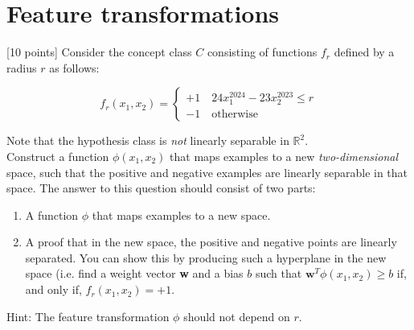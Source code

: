 \section{Feature transformations}\label{sec:q2}

[10 points] Consider the concept class $C$ consisting of functions $f_r$ defined by a radius $r$ as follows:

\begin{equation*}
            f_r(x_1,x_2) = \begin{cases}
                +1 \quad 24x_1^{2024}-23x_2^{2023}\leq r \\
                -1 \quad \text{otherwise}
            \end{cases}
            \label{eq-0}
        \end{equation*}

Note that the hypothesis class is \textit{not} linearly separable in $\mathbb{R}^2$.\\

Construct a function $\phi(x_1,x_2)$ that maps examples to a new \emph{two-dimensional} space, such that the positive and negative examples are linearly separable in that space. The answer to this question should consist of two parts: 
\begin{enumerate}
\item A function $\phi$ that maps examples to a new space.
\item A proof that in the new space, the positive and negative points are linearly separated. You can show this by producing such a hyperplane in the new space (i.e. find a weight vector \textbf{w} and a bias $b$ such that $\textbf{w}^T\phi(x_1,x_2)\geq b$ if, and only if, $f_r(x_1,x_2)=+1$.
\end{enumerate}
Hint: The feature transformation $\phi$ should not depend on $r$.

